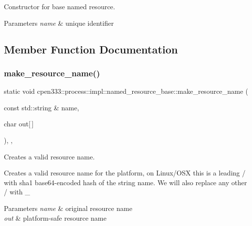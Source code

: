 Constructor for base named resource. 


\begin{DoxyParams}{Parameters}
{\em name} & unique identifier \\
\hline
\end{DoxyParams}


\subsection{Member Function Documentation}
\mbox{\label{classcpen333_1_1process_1_1impl_1_1named__resource__base_a3a513fc13851a3a72b4cc5ea8aa0e104}} 
\subsubsection{\texorpdfstring{make\+\_\+resource\+\_\+name()}{make\_resource\_name()}}
{\footnotesize\ttfamily static void cpen333\+::process\+::impl\+::named\+\_\+resource\+\_\+base\+::make\+\_\+resource\+\_\+name (\begin{DoxyParamCaption}\item[{const std\+::string \&}]{name,  }\item[{char}]{out\mbox{[}$\,$\mbox{]} }\end{DoxyParamCaption})\hspace{0.3cm}{\ttfamily [inline]}, {\ttfamily [static]}, {\ttfamily [protected]}}



Creates a valid resource name. 

Creates a valid resource name for the platform, on Linux/\+O\+SX this is a leading \textquotesingle{}/\textquotesingle{} with sha1 base64-\/encoded hash of the string name. We will also replace any other \textquotesingle{}/\textquotesingle{} with \textquotesingle{}\+\_\+\textquotesingle{} 
\begin{DoxyParams}{Parameters}
{\em name} & original resource name \\
\hline
{\em out} & platform-\/safe resource name \\
\hline
\end{DoxyParams}
\mbox{\label{classcpen333_1_1process_1_1impl_1_1named__resource__base_ae0c5fbb1843afe863cece4b51c38f807}} 
